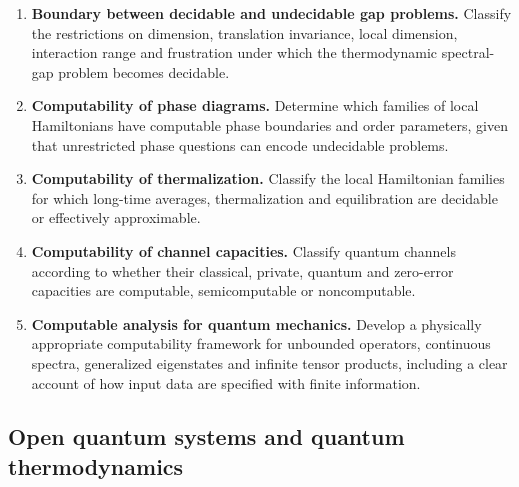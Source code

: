 \documentclass{article}
\begin{document}
\begin{enumerate}[label=\textbf{U\arabic*.},leftmargin=*]

\item \precise{} \textbf{Boundary between decidable and undecidable gap problems.}
Classify the restrictions on dimension, translation invariance, local
dimension, interaction range and frustration under which the
thermodynamic spectral-gap problem becomes decidable.

\item \precise{} \textbf{Computability of phase diagrams.}
Determine which families of local Hamiltonians have computable phase
boundaries and order parameters, given that unrestricted phase
questions can encode undecidable problems.

\item \precise{} \textbf{Computability of thermalization.}
Classify the local Hamiltonian families for which long-time averages,
thermalization and equilibration are decidable or effectively
approximable.

\item \precise{} \textbf{Computability of channel capacities.}
Classify quantum channels according to whether their classical,
private, quantum and zero-error capacities are computable,
semicomputable or noncomputable.

\item \formalism{} \textbf{Computable analysis for quantum mechanics.}
Develop a physically appropriate computability framework for
unbounded operators, continuous spectra, generalized eigenstates and
infinite tensor products, including a clear account of how input data
are specified with finite information.

\end{enumerate}


\subsection{Open quantum systems and quantum thermodynamics}
\end{document}
